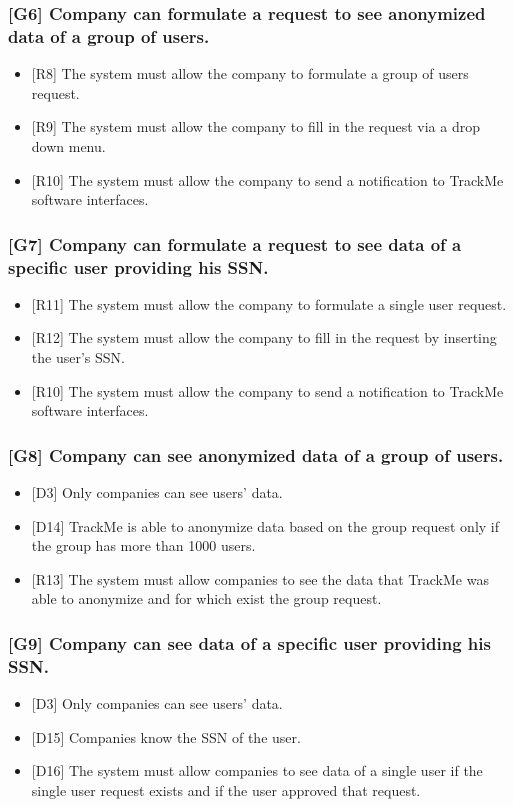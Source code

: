 \documentclass{article}
\begin{document}
\subsubsection{[G6] Company can formulate a request to see anonymized data of a group of users.}
\begin{itemize}
\item {[R8]} The system must allow the company to formulate a group of users request.
\item {[R9]} The system must allow the company to fill in the request via a drop down menu.
\item {[R10]} The system must allow the company to send a notification to TrackMe software interfaces.
\end{itemize}
\subsubsection{[G7] Company can formulate a request to see data of a specific user providing his SSN.}
\begin{itemize}
\item {[R11]} The system must allow the company to formulate a single user request.
\item {[R12]} The system must allow the company to fill in the request by inserting the user's SSN.
\item {[R10]} The system must allow the company to send a notification to TrackMe software interfaces.
\end{itemize}
\subsubsection{[G8] Company can see anonymized data of a group of users.}
\begin{itemize}
\item {[D3]} Only companies can see users’ data.
\item {[D14]} TrackMe is able to anonymize data based on the group request only if the group has more than 1000 users.
\item {[R13]} The system must allow companies to see the data that TrackMe was able to anonymize and for which exist the group request.
\end{itemize}
\subsubsection{[G9] Company can see data of a specific user providing his SSN.}
\begin{itemize}
\item {[D3]} Only companies can see users’ data.
\item {[D15]} Companies know the SSN of the user.
\item {[D16]} The system must allow companies to see data of a single user if the single user request exists and if the user approved that request.
\end{itemize}
\end{document}
